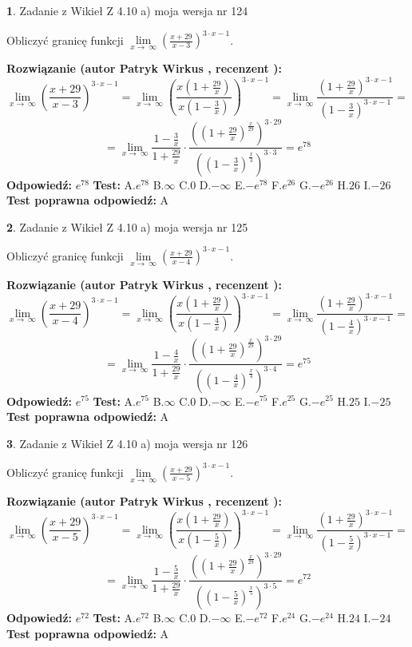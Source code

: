 \documentclass[12pt, a4paper]{article}
\theoremstyle{definition} %
\newtheorem{zad}{}
\newcommand{\zadStart}[1]{\begin{zad}#1\newline}
\newcommand{\zadStop}{\end{zad}}
\newcommand{\rozwStart}[2]{\noindent \textbf{Rozwiązanie (autor #1 , recenzent #2): }\newline}
\newcommand{\rozwStop}{\newline}
\newcommand{\odpStart}{\noindent \textbf{Odpowiedź:}\newline}
\newcommand{\odpStop}{\newline}
\newcommand{\testStart}{\noindent \textbf{Test:}\newline}
\newcommand{\testStop}{\newline}
\newcommand{\kluczStart}{\noindent \textbf{Test poprawna odpowiedź:}\newline}
\newcommand{\kluczStop}{\newline}
\begin{document}
\zadStart{Zadanie z Wikieł Z 4.10 a) moja wersja nr 124}

Obliczyć granicę funkcji  $\lim\limits_{x\to\ \infty}(\frac{x+29}{x-3})^{3\cdot x-1}$.
\zadStop
\rozwStart{Patryk Wirkus}{}
$$\lim\limits_{x\to\ \infty}(\frac{x+29}{x-3})^{3\cdot x-1} = \lim\limits_{x\to\ \infty}(\frac{x(1+\frac{29}{x})}{x(1-\frac{3}{x})})^{3\cdot x-1}=\lim\limits_{x\to\ \infty}\frac{(1+\frac{29}{x})^{3\cdot x-1}}{(1-\frac{3}{x})^{3\cdot x-1}}=$$
$$=\lim\limits_{x\to\ \infty}\frac{1-\frac{3}{x}}{1+\frac{29}{x}}\cdot\frac{((1+\frac{29}{x})^{\frac{x}{29}})^{3\cdot29}}{((1-\frac{3}{x})^{\frac{x}{3}})^{3\cdot3}}=e^{78}$$
\rozwStop
\odpStart
$e^{78}$
\odpStop
\testStart
A.$e^{78}$ B.$\infty$ C.$0$ D.$-\infty$ E.$-e^{78}$
F.$e^{26}$ G.$-e^{26}$
H.$26$
I.$-26$
\testStop
\kluczStart
A
\kluczStop



\zadStart{Zadanie z Wikieł Z 4.10 a) moja wersja nr 125}

Obliczyć granicę funkcji  $\lim\limits_{x\to\ \infty}(\frac{x+29}{x-4})^{3\cdot x-1}$.
\zadStop
\rozwStart{Patryk Wirkus}{}
$$\lim\limits_{x\to\ \infty}(\frac{x+29}{x-4})^{3\cdot x-1} = \lim\limits_{x\to\ \infty}(\frac{x(1+\frac{29}{x})}{x(1-\frac{4}{x})})^{3\cdot x-1}=\lim\limits_{x\to\ \infty}\frac{(1+\frac{29}{x})^{3\cdot x-1}}{(1-\frac{4}{x})^{3\cdot x-1}}=$$
$$=\lim\limits_{x\to\ \infty}\frac{1-\frac{4}{x}}{1+\frac{29}{x}}\cdot\frac{((1+\frac{29}{x})^{\frac{x}{29}})^{3\cdot29}}{((1-\frac{4}{x})^{\frac{x}{4}})^{3\cdot4}}=e^{75}$$
\rozwStop
\odpStart
$e^{75}$
\odpStop
\testStart
A.$e^{75}$ B.$\infty$ C.$0$ D.$-\infty$ E.$-e^{75}$
F.$e^{25}$ G.$-e^{25}$
H.$25$
I.$-25$
\testStop
\kluczStart
A
\kluczStop



\zadStart{Zadanie z Wikieł Z 4.10 a) moja wersja nr 126}

Obliczyć granicę funkcji  $\lim\limits_{x\to\ \infty}(\frac{x+29}{x-5})^{3\cdot x-1}$.
\zadStop
\rozwStart{Patryk Wirkus}{}
$$\lim\limits_{x\to\ \infty}(\frac{x+29}{x-5})^{3\cdot x-1} = \lim\limits_{x\to\ \infty}(\frac{x(1+\frac{29}{x})}{x(1-\frac{5}{x})})^{3\cdot x-1}=\lim\limits_{x\to\ \infty}\frac{(1+\frac{29}{x})^{3\cdot x-1}}{(1-\frac{5}{x})^{3\cdot x-1}}=$$
$$=\lim\limits_{x\to\ \infty}\frac{1-\frac{5}{x}}{1+\frac{29}{x}}\cdot\frac{((1+\frac{29}{x})^{\frac{x}{29}})^{3\cdot29}}{((1-\frac{5}{x})^{\frac{x}{5}})^{3\cdot5}}=e^{72}$$
\rozwStop
\odpStart
$e^{72}$
\odpStop
\testStart
A.$e^{72}$ B.$\infty$ C.$0$ D.$-\infty$ E.$-e^{72}$
F.$e^{24}$ G.$-e^{24}$
H.$24$
I.$-24$
\testStop
\kluczStart
A
\kluczStop
\end{document}
